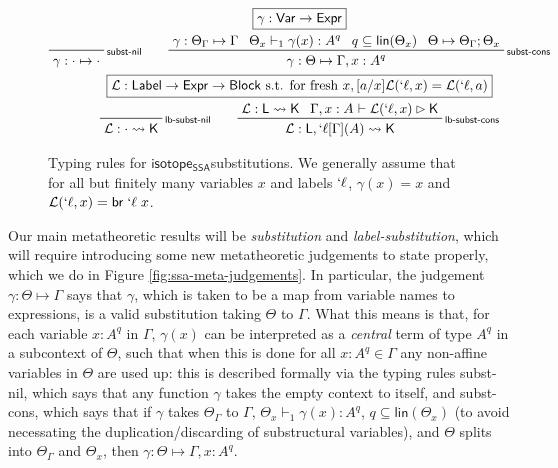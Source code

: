 \documentclass[acmsmall,screen,review]{acmart}
\newcommand{\mc}[1]{\ensuremath{\mathcal{#1}}}
\newcommand{\ms}[1]{\ensuremath{\mathsf{#1}}}
\newcommand{\lbl}[1]{{`#1}}
\newcommand{\brb}[2]{\ms{br}\;#1\;#2}
\newcommand{\lbrb}[2]{\brb{\lbl{#1}}{#2}}
\newcommand{\csplits}[3]{#1 \mapsto #2;#3}
\newcommand{\tlin}[2]{#2 \subseteq \ms{lin}(#1)}
\newcommand{\thyp}[3]{#1: {#2}^{#3}}
\newcommand{\lhyp}[3]{#1[#2](#3)}
\newcommand{\llhyp}[3]{\lhyp{\lbl{#1}}{#2}{#3}}
\newcommand{\rle}[1]{{\scriptsize\textsf{#1}}}
\newcommand{\hasty}[5]{#1 \vdash_{#2} #3: {#4}^{#5}}
\newcommand{\haslb}[3]{#1 \vdash #2 \rhd #3}
\newcommand{\issubst}[3]{#1: #2 \mapsto #3}
\newcommand{\lbsubst}[3]{#1: #2 \rightsquigarrow #3}
\newcommand{\isotopessa}{\ms{isotope_{SSA}}}
\begin{document}
\begin{figure}
  \begin{gather*}
    \boxed{\gamma: \ms{Var} \to \ms{Expr}}
    \\
    \prftree[r]{\rle{subst-nil}}
      {\issubst{\gamma}{\cdot}{\cdot}}
      \qquad
    \prftree[r]{\rle{subst-cons}}
      {\issubst{\gamma}{\Theta_\Gamma}{\Gamma}}
      {\hasty{\Theta_x}{1}{\gamma(x)}{A}{q}}
      {\tlin{\Theta_x}{q}}
      {\csplits{\Theta}{\Theta_\Gamma}{\Theta_x}}
      {\issubst{\gamma}{\Theta}{\Gamma, \thyp{x}{A}{q}}}
    \\
    \boxed{\mc{L}: \ms{Label} \to \ms{Expr} \to \ms{Block} \text{ s.t. for fresh } x, [a/x]\mc{L}(\lbl{\ell}, x) = \mc{L}(\lbl{\ell}, a)}
    \\
    \prftree[r]{\rle{lb-subst-nil}}
    {\lbsubst{\mc{L}}{\cdot}{\ms{K}}}
      \qquad
    \prftree[r]{\rle{lb-subst-cons}}
      {\lbsubst{\mc{L}}{\ms{L}}{\ms{K}}}
      {\haslb{\Gamma, \thyp{x}{A}{}}{\mc{L}(\lbl{\ell}, x)}{\ms{K}}}
      {\lbsubst{\mc{L}}{\ms{L}, \llhyp{\ell}{\Gamma}{A}}{\ms{K}}}
  \end{gather*}
  \caption{ Typing rules for \isotopessa substitutions. We generally assume that
    for all but finitely many variables \(x\) and labels \(\lbl{\ell}\),
    \(\gamma(x) = x\) and \(\mc{L}(\lbl{\ell}, x) = \lbrb{\ell}{x}\). }
  \label{fig:ssa-subst-typing}
\end{figure}

Our main metatheoretic results will be \textit{substitution} and
\textit{label-substitution}, which will require introducing some new
metatheoretic judgements to state properly, which we do in Figure
\ref{fig:ssa-meta-judgements}. In particular, the judgement
\(\issubst{\gamma}{\Theta}{\Gamma}\) says that \(\gamma\), which is taken to be
a map from variable names to expressions, is a valid substitution taking
\(\Theta\) to \(\Gamma\). What this means is that, for each variable
\(\thyp{x}{A}{q}\) in \(\Gamma\), \(\gamma(x)\) can be interpreted as a
\textit{central} term of type \(A^q\) in a subcontext of \(\Theta\), such that
when this is done for all \(\thyp{x}{A}{q} \in \Gamma\) any non-affine variables
in \(\Theta\) are used up: this is described formally via the typing rules
\rle{subst-nil}, which says that any function \(\gamma\) takes the empty context
to itself, and \rle{subst-cons}, which says that if \(\gamma\) takes
\(\Theta_\Gamma\) to \(\Gamma\), \(\hasty{\Theta_x}{1}{\gamma(x)}{A}{q}\), \(q
\subseteq \ms{lin}(\Theta_x)\) (to avoid necessating the duplication/discarding
of substructural variables), and \(\Theta\) splits into \(\Theta_\Gamma\) and
\(\Theta_x\), then \(\issubst{\gamma}{\Theta}{\Gamma, \thyp{x}{A}{q}}\).
\end{document}
